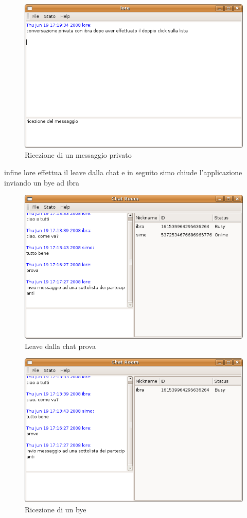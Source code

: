 \begin{figure}[H]
\begin{center}
\includegraphics[scale=0.5]{etc/ricezione_pm.png}
\caption{Ricezione di un messaggio privato}
\label{ricezionepm}
\end{center}
\end{figure}
infine lore effettua il leave dalla chat e in seguito simo chiude l'applicazione inviando un bye ad ibra
\begin{figure}[H]
\begin{center}
\includegraphics[scale=0.5]{etc/leave_lore.png}
\caption{Leave dalla chat prova}
\label{leavelore}
\end{center}
\end{figure}
\begin{figure}[H]
\begin{center}
\includegraphics[scale=0.5]{etc/bye_simo.png}
\caption{Ricezione di un bye}
\label{byesimo}
\end{center}
\end{figure}
\lstset{basicstyle=\scriptsize}
